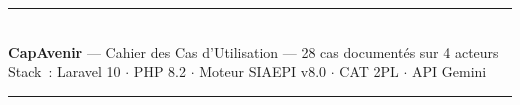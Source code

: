 \documentclass[a4paper,12pt]{article}
\begin{document}
\vspace{2em}
\begin{center}
{\color{capblue}\rule{\linewidth}{1pt}}\\[0.5em]
{\small\textbf{CapAvenir} --- Cahier des Cas d'Utilisation --- 28 cas documentés sur 4 acteurs}\\[0.2em]
{\small Stack~: Laravel 10 $\cdot$ PHP 8.2 $\cdot$ Moteur SIAEPI v8.0 $\cdot$ CAT 2PL $\cdot$ API Gemini}\\[0.3em]
{\color{capblue}\rule{\linewidth}{1pt}}
\end{center}
\end{document}
